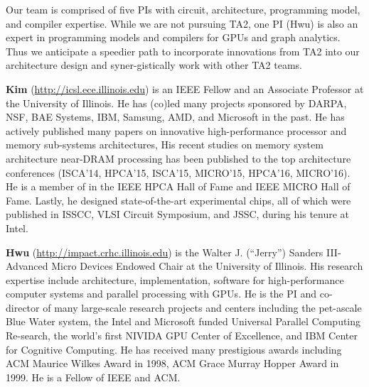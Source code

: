 Our team is comprised of five PIs with circuit, architecture, programming model, and compiler expertise. 
While we are not pursuing TA2, one PI (Hwu) is also an expert in programming models and compilers for GPUs and graph analytics. 
Thus we anticipate a speedier path to incorporate innovations from TA2 into our architecture design and syner-gistically work with other TA2 teams.

\vspace{3pt}
\noindent
\textbf{Kim} (\url{http://icsl.ece.illinois.edu}) is an IEEE Fellow and an Associate Professor at the University of Illinois. 
He has (co)led many projects sponsored by DARPA, NSF, BAE Systems, IBM, Samsung, AMD, and Microsoft in the past. 
He has actively published many papers on innovative high-performance processor and memory sub-systems architectures, 
His recent studies on memory system architecture near-DRAM processing has been published to the top architecture conferences (ISCA'14, HPCA'15, ISCA'15, MICRO'15, HPCA'16, MICRO'16).
He is a member of in the IEEE HPCA Hall of Fame and IEEE MICRO Hall of Fame. 
Lastly, he designed state-of-the-art experimental chips, all of which were published in ISSCC, VLSI Circuit Symposium, and JSSC, during his tenure at Intel.

\vspace{3pt}
\noindent
\textbf{Hwu} (\url{http://impact.crhc.illinois.edu}) is the Walter J. (``Jerry'') Sanders III-Advanced Micro Devices Endowed Chair at the University of Illinois. 
His research expertise include architecture, implementation, software for high-performance computer systems and parallel processing with GPUs. 
He is the PI and co-director of many large-scale research projects and centers including the pet-ascale Blue Water system, the Intel and Microsoft funded Universal Parallel Computing Re-search, the world’s first NIVIDA GPU Center of Excellence, and IBM Center for Cognitive Computing. 
He has received many prestigious awards including ACM Maurice Wilkes Award in 1998, ACM Grace Murray Hopper Award in 1999. He is a Fellow of IEEE and ACM.

